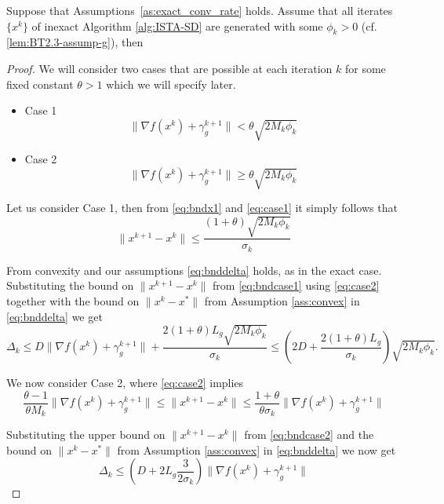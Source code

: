 \documentclass[11pt]{article}
\numberwithin{equation}{section}
\begin{document}
\begin{theorem}
	Suppose that Assumptions~\ref{as:exact_conv_rate} holds. 
	Assume that all iterates $\{x^k\}$ of inexact Algorithm \ref{alg:ISTA-SD} are generated with some $\phi_k>0$ (cf. \eqref{lem:BT2.3-assump-g}), then
\end{theorem}
\begin{proof}	                
	We will consider two cases that are possible at each iteration $k$ for some fixed constant $\theta>1$ which we will specify later. 
	\begin{itemize}
	\item{Case 1} 
	\begin{equation}\label{eq:case1}
	\|  \nabla f(x^k) + \gamma_g^{k+1} \| < \theta\sqrt{2M_k\phi_k}
	\end{equation}


	\item{Case 2}
	\begin{equation}\label{eq:case2}
	\| \nabla f(x^k) + \gamma_g^{k+1} \| \geq \theta \sqrt{2M_k\phi_k}
	\end{equation}

	\end{itemize}

	Let us consider  Case 1, then from \eqref{eq:bndx1}  and \eqref{eq:case1} it simply follows that
	\begin{equation}\label{eq:bndcase1} 
	\| x^{k+1} - x^k\|\leq \frac{(1+\theta)\sqrt{2M_k\phi_k}}{\sigma_k}
	\end{equation}

	From convexity and our assumptions \eqref{eq:bnddelta} holds, as in the exact case.
	  Substituting the bound on  $\| x^{k+1} - x^k\|$ from \eqref{eq:bndcase1} using \eqref{eq:case2} together with the bound on $\|x^{k} - x^*\|$
	  from  Assumption \ref{ass:convex} in \eqref{eq:bnddelta} we get  
	 \[
	  \Delta_k\leq D \|\nabla f(x^k)+\gamma_g^{k+1}\| +  \frac{2(1+\theta)L_g\sqrt{2M_k\phi_k}}{\sigma_k}\leq (2D+  \frac{2(1+\theta)L_g}{\sigma_k})\sqrt{2M_k\phi_k}.
	  \]
	  
	We now consider Case 2, where \eqref{eq:case2} implies
	\begin{equation}\label{eq:bndcase2} 
	\frac{\theta-1}{\theta M_k}\| \nabla f(x^k) + \gamma_g^{k+1} \| \leq \| x^{k+1} - x^k\|\leq \frac{1+\theta}{\theta\sigma_k}\| \nabla f(x^k) + \gamma_g^{k+1} \|
	\end{equation}

	 Substituting the upper bound on  $\| x^{k+1} - x^k\|$ from \eqref{eq:bndcase2} and  the bound on $\|x^{k} - x^*\|$
	  from  Assumption \ref{ass:convex} in \eqref{eq:bnddelta} we now get  
	 \begin{equation}\label{eq:upperbndinexact}
	  \Delta_k\leq 
	 (D + 2L_g\frac{3}{2\sigma_k})\|\nabla f(x^k)+\gamma_g^{k+1}\|
	  \end{equation}


\end{proof}
\end{document}

